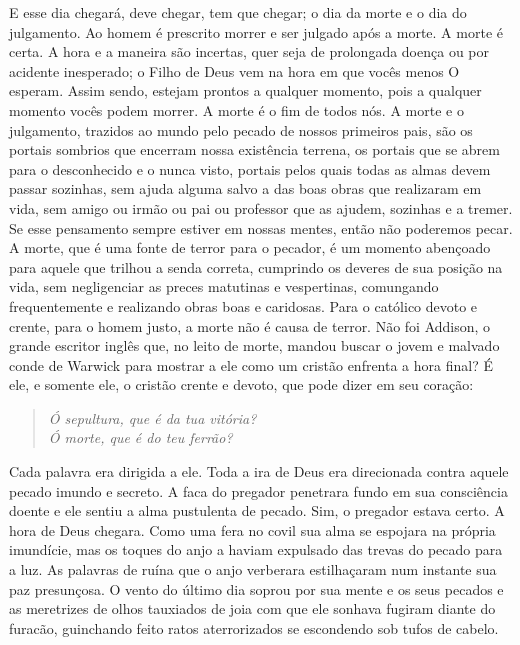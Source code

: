 E esse dia chegará, deve chegar, tem que chegar; o dia da morte e o dia
do julgamento. Ao homem é prescrito morrer e ser julgado após a morte.
A morte é certa. A hora e a maneira são incertas, quer seja de
prolongada doença ou por acidente inesperado; o Filho de Deus vem na
hora em que vocês menos O esperam. Assim sendo, estejam prontos a
qualquer momento, pois a qualquer momento vocês podem morrer. A morte é
o fim de todos nós. A morte e o julgamento, trazidos ao mundo pelo
pecado de nossos primeiros pais, são os portais sombrios que encerram
nossa existência terrena, os portais que se abrem para o desconhecido e
o nunca visto, portais pelos quais todas as almas devem passar
sozinhas, sem ajuda alguma salvo a das boas obras que realizaram em
vida, sem amigo ou irmão ou pai ou professor que as ajudem, sozinhas e
a tremer. Se esse pensamento sempre estiver em nossas mentes, então não
poderemos pecar. A morte, que é uma fonte de terror para o pecador, é
um momento abençoado para aquele que trilhou a senda correta, cumprindo
os deveres de sua posição na vida, sem negligenciar as preces matutinas
e vespertinas, comungando frequentemente e realizando obras boas e
caridosas. Para o católico devoto e crente, para o homem justo, a morte
não é causa de terror. Não foi Addison, o grande escritor inglês que,
no leito de morte, mandou buscar o jovem e malvado conde de
Warwick para mostrar a ele como um cristão enfrenta a hora final? É
ele, e somente ele, o cristão crente e devoto, que pode dizer em seu
coração:

\begin{verse}\itshape
Ó sepultura, que é da tua vitória?\\
Ó morte, que é do teu ferrão?
\end{verse}

Cada palavra era dirigida a ele. Toda a ira de Deus era direcionada
contra aquele pecado imundo e secreto. A faca do pregador penetrara
fundo em sua consciência doente e ele sentiu a alma pustulenta de
pecado. Sim, o pregador estava certo. A hora de Deus chegara. Como uma
fera no covil sua alma se espojara na própria imundície, mas os toques
do anjo a haviam expulsado das trevas do pecado para a luz. As palavras
de ruína que o anjo verberara estilhaçaram num instante sua paz
presunçosa. O vento do último dia soprou por sua mente e os seus
pecados e as meretrizes de olhos tauxiados de joia com que ele sonhava
fugiram diante do furacão, guinchando feito ratos aterrorizados se
escondendo sob tufos de cabelo.

